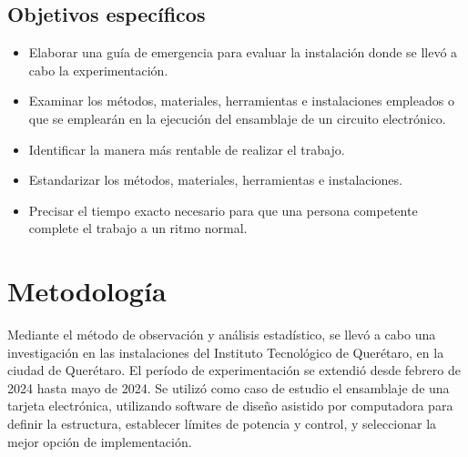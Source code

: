 \subsection{Objetivos específicos }


% 
% 
\begin{itemize}
% 
\item Elaborar una guía de emergencia para evaluar la instalación donde se llevó a cabo la experimentación.
\item Examinar los métodos, materiales, herramientas e instalaciones empleados o que se emplearán en la ejecución del ensamblaje de un circuito electrónico.
\item Identificar la manera más rentable de realizar el trabajo.
\item Estandarizar los métodos, materiales, herramientas e instalaciones.
\item Precisar el tiempo exacto necesario para que una persona competente complete el trabajo a un ritmo normal.
\end{itemize}
% 
    
    
\section{Metodología}
%
Mediante el método de observación y análisis estadístico, se llevó a cabo una investigación en las instalaciones del Instituto Tecnológico de Querétaro, en la ciudad de Querétaro. El período de experimentación se extendió desde febrero de 2024 hasta mayo de 2024. Se utilizó como caso de estudio el ensamblaje de una tarjeta electrónica, utilizando software de diseño asistido por computadora para definir la estructura, establecer límites de potencia y control, y seleccionar la mejor opción de implementación.

